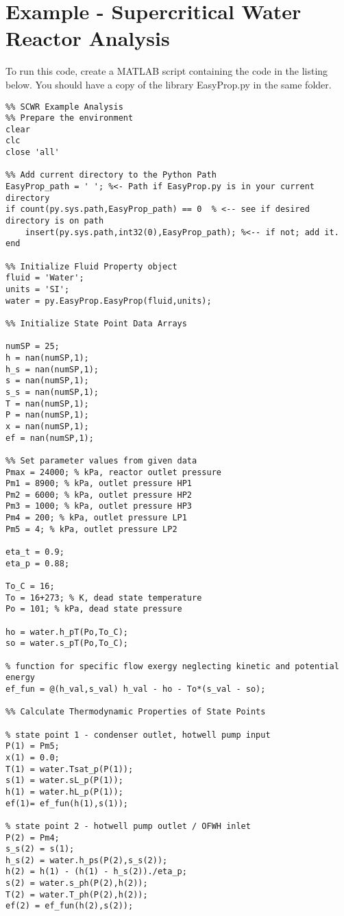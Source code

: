 \chapter{Example - Supercritical Water Reactor Analysis}
\label{app:SCWR_ex}

To run this code, create a MATLAB script containing the code in the listing below.  You should have a copy of the library EasyProp.py in the same folder.

\begin{fullwidth}
\begin{lstlisting}
%% SCWR Example Analysis
%% Prepare the environment
clear
clc
close 'all'

%% Add current directory to the Python Path
EasyProp_path = ' '; %<- Path if EasyProp.py is in your current directory
if count(py.sys.path,EasyProp_path) == 0  % <-- see if desired directory is on path
    insert(py.sys.path,int32(0),EasyProp_path); %<-- if not; add it.
end

%% Initialize Fluid Property object
fluid = 'Water';
units = 'SI';
water = py.EasyProp.EasyProp(fluid,units);

%% Initialize State Point Data Arrays

numSP = 25;
h = nan(numSP,1);
h_s = nan(numSP,1);
s = nan(numSP,1);
s_s = nan(numSP,1);
T = nan(numSP,1);
P = nan(numSP,1);
x = nan(numSP,1);
ef = nan(numSP,1);

%% Set parameter values from given data
Pmax = 24000; % kPa, reactor outlet pressure
Pm1 = 8900; % kPa, outlet pressure HP1
Pm2 = 6000; % kPa, outlet pressure HP2
Pm3 = 1000; % kPa, outlet pressure HP3
Pm4 = 200; % kPa, outlet pressure LP1
Pm5 = 4; % kPa, outlet pressure LP2

eta_t = 0.9;
eta_p = 0.88;

To_C = 16;
To = 16+273; % K, dead state temperature
Po = 101; % kPa, dead state pressure

ho = water.h_pT(Po,To_C);
so = water.s_pT(Po,To_C);

% function for specific flow exergy neglecting kinetic and potential energy
ef_fun = @(h_val,s_val) h_val - ho - To*(s_val - so);

%% Calculate Thermodynamic Properties of State Points

% state point 1 - condenser outlet, hotwell pump input
P(1) = Pm5;
x(1) = 0.0;
T(1) = water.Tsat_p(P(1));
s(1) = water.sL_p(P(1));
h(1) = water.hL_p(P(1));
ef(1)= ef_fun(h(1),s(1));

% state point 2 - hotwell pump outlet / OFWH inlet
P(2) = Pm4;
s_s(2) = s(1);
h_s(2) = water.h_ps(P(2),s_s(2));
h(2) = h(1) - (h(1) - h_s(2))./eta_p;
s(2) = water.s_ph(P(2),h(2));
T(2) = water.T_ph(P(2),h(2));
ef(2) = ef_fun(h(2),s(2));


\end{lstlisting}
\end{fullwidth}
